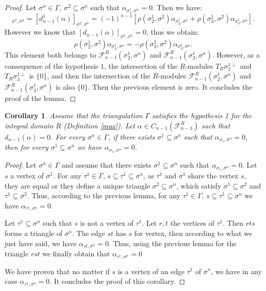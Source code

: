\documentclass{article}
\newtheorem{corollary}{Corollary}
\begin{document}
\begin{proof}
    Let  $\sigma^n \in \Gamma, ~\sigma^2 \subseteq \sigma^n$ such that $\alpha_{\sigma^1_1,\sigma^n} = 0$. Then we have:
    \begin{equation*}
        [d_{n-1}(\alpha)]_{\sigma^2,\sigma^n} = [d_{n-1}^{1}(\alpha)]_{\sigma^2,\sigma^n} = (-1)^{n-1} \left [ \rho(\sigma^1_2,\sigma^2)\alpha_{\sigma^1_2,\sigma^n} + \rho(\sigma^1_3,\sigma^2)\alpha_{\sigma^1_3,\sigma^n} \right ].
    \end{equation*}
    However we know that $[d_{n-1}(\alpha)]_{\sigma^2,\sigma^n} = 0$, thus we obtain:
    \begin{equation*}
        \rho(\sigma^1_2,\sigma^2)\alpha_{\sigma^1_2,\sigma^n} = - \rho(\sigma^1_3,\sigma^2)\alpha_{\sigma^1_3,\sigma^n}.
    \end{equation*}
    This element both belongs to $\mathcal{F}_{n-1}^{R}(\sigma^1_2,\sigma^n)$ and $\mathcal{F}_{n-1}^{R}(\sigma^1_3,\sigma^n)$. However, as a consequence of the hypothesis $1$, the intersection of the $R$-modules $T_R\sigma^{1\perp}_2$ and $T_R\sigma^{1\perp}_3$ is $\{0\}$, and then the intersection of the $R$-modules $\mathcal{F}_{n-1}^{R}(\sigma^1_2,\sigma^n)$ and $\mathcal{F}_{n-1}^{R}(\sigma^1_3,\sigma^n)$ is also $\{0\}$. Then the previous element is zero. It concludes the proof of the lemma.
\end{proof}

\begin{corollary}
    Assume that the triangulation $\Gamma$ satisfies the hypothesis 1 for the integral domain $R$ (Definition \ref{max}). Let $\alpha \in C_{n-1}(\mathcal{F}_{n-1}^{R})$ such that $d_{n-1}(\alpha) = 0$. For every $\sigma^n \in \Gamma$, if there exists $\sigma^1 \subseteq \sigma^n$ such that $\alpha_{\sigma_1, \sigma^n} = 0$, then for every $\sigma^1 \subseteq\sigma^n$ we have $\alpha_{\sigma_1, \sigma^n} = 0$.
\end{corollary}

\begin{proof}
    Let $\sigma^n \in \Gamma$ and assume that there exists $\sigma^1 \subseteq \sigma^n$ such that $\alpha_{\sigma_1, \sigma^n} = 0$. Let $s$ a vertex of $\sigma^1$. For any $\tau^1 \in \Gamma$, $s \subseteq \tau^1 \subseteq \sigma^n$, as $\tau^1$ and $\sigma^1$ share the vertex $s$, they are equal or they define a unique triangle $\sigma^2 \subseteq \sigma^n$, which satisfy $\sigma^1 \subseteq \sigma^2$ and $\tau^1 \subseteq \sigma^2$. Thus, according to the previous lemma, for any $\tau^1 \in \Gamma$, $s \subseteq \tau^1 \subseteq \sigma^n$ we have $\alpha_{\tau^1,\sigma^n} = 0$.

    Let $\tau^1 \subseteq \sigma^n$ such that $s$ is not a vertex of $\tau^1$. Let $r,t$ the vertices of $\tau^1$. Then $rts$ forms a triangle of $\sigma^n$. The edge $st$ has $s$ for vertex, then according to what we just have said, we have $\alpha_{st,\sigma^n} = 0$. Thus, using the previous lemma for the triangle $rst$ we finally obtain that $\alpha_{\tau^1,\sigma^n} = 0$

    We have proven that no matter if $s$ is a vertex of an edge $\tau^1$ of $\sigma^n$, we have in any case $\alpha_{\tau^1,\sigma^n} = 0$. It concludes the proof of this corollary.
\end{proof}
\end{document}
